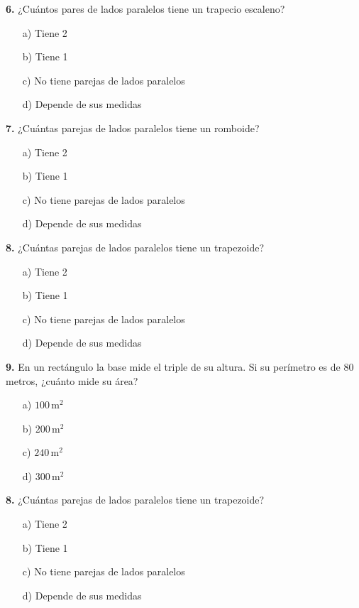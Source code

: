 \noindent\textbf{6.} ¿Cuántos pares de lados paralelos tiene un trapecio escaleno?
\begin{itemize}
    \item[a)] Tiene 2
    \item[b)] Tiene 1
    \item[c)] No tiene parejas de lados paralelos
    \item[d)] Depende de sus medidas
\end{itemize}

\noindent\textbf{7.} ¿Cuántas parejas de lados paralelos tiene un romboide?

\begin{itemize}
    \item[a)] Tiene 2
    \item[b)] Tiene 1
    \item[c)] No tiene parejas de lados paralelos
    \item[d)] Depende de sus medidas
\end{itemize}


\noindent\textbf{8.} ¿Cuántas parejas de lados paralelos tiene un trapezoide?

\begin{itemize}
    \item[a)] Tiene 2
    \item[b)] Tiene 1
    \item[c)] No tiene parejas de lados paralelos
    \item[d)] Depende de sus medidas
\end{itemize}

\noindent\textbf{9.} En un rectángulo la base mide el triple de su altura. Si su perímetro es de 80 metros, ¿cuánto mide su área?

\begin{itemize}
    \item[a)] $100\,\text{m}^2$
    \item[b)] $200\,\text{m}^2$
    \item[c)] $240\,\text{m}^2$
    \item[d)] $300\,\text{m}^2$
\end{itemize}

\noindent\textbf{8.} ¿Cuántas parejas de lados paralelos tiene un trapezoide?

\begin{itemize}
    \item[a)] Tiene 2
    \item[b)] Tiene 1
    \item[c)] No tiene parejas de lados paralelos
    \item[d)] Depende de sus medidas
\end{itemize}

